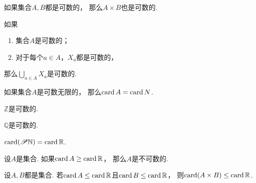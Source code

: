 \begin{proposition}
如果集合\(A,B\)都是可数的，
那么\(A \times B\)也是可数的.
\end{proposition}

\begin{proposition}
如果
\begin{enumerate}
	\item 集合\(A\)是可数的；
	\item 对于每个\(a \in A\)，\(X_a\)都是可数的，
\end{enumerate}
那么\(\bigcup_{a \in A} X_a\)是可数的.
\end{proposition}

\begin{proposition}
如果集合\(A\)是可数无限的，
那么\(\operatorname{card} A = \operatorname{card}{N}\).
\end{proposition}

\begin{corollary}
\(\mathbb{Z}\)是可数的.
\end{corollary}

\begin{corollary}
\(\mathbb{Q}\)是可数的.
\end{corollary}

\begin{proposition}
\(\operatorname{card}(\mathscr{P}\mathbb{N}) = \operatorname{card}\mathbb{R}\).
\end{proposition}

\begin{corollary}
设\(A\)是集合.
如果\(\operatorname{card} A \geq \operatorname{card}\mathbb{R}\)，
那么\(A\)是不可数的.
\end{corollary}

\begin{proposition}
设\(A,B\)都是集合.
若\(\operatorname{card} A \leq \operatorname{card}\mathbb{R}\)且\(\operatorname{card} B \leq \operatorname{card}\mathbb{R}\)，
则\(\operatorname{card}(A \times B) \leq \operatorname{card}\mathbb{R}\).
\end{proposition}

